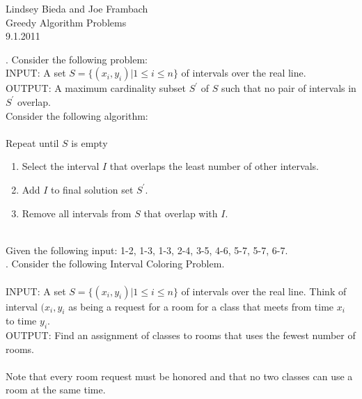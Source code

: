 \documentclass[10pt]{article}
\begin{document}
	\begin{flushright}
	Lindsey Bieda and Joe Frambach\\
	Greedy Algorithm Problems\\
	9.1.2011
	\end{flushright}
	. Consider the following problem:\\ 
	INPUT: A set $ S = \{(x_{i},y_{i})| 1\leq i \leq n\} $ of intervals over the real line.\\
	OUTPUT: A maximum cardinality subset $S^{\prime}$ of $S$ such that no pair of intervals in $S^{\prime}$ overlap. \\
	Consider the following algorithm:\\
	\\
	Repeat until $S$ is empty
	\begin{enumerate}
		\item Select the interval $I$ that overlaps the least number of other intervals.
		\item Add $I$ to final solution set $S^{\prime}$.
		\item Remove all intervals from $S$ that overlap with $I$.
	\end{enumerate}
	\\
	Given the following input:  1-2, 1-3, 1-3, 2-4, 3-5, 4-6, 5-7, 5-7, 6-7.
	\\
	. Consider the following Interval Coloring Problem.\\
	\\
	INPUT: A set $ S = \{(x_{i},y_{i})| 1\leq i \leq n\} $ of intervals over the real line. 
	Think of interval $(x_{i},y_{i}$ as being a request for a room for a class that meets from 
	time $x_{i}$ to time $y_{i}$.\\
	OUTPUT: Find an assignment of classes to rooms that uses the fewest number of rooms.\\
	\\
	Note that every room request must be honored and that no two classes can use a room at the
	same time. 
\end{document}
